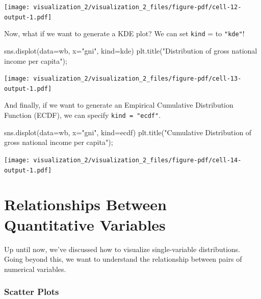 \documentclass[
  letterpaper,
  DIV=11,
  numbers=noendperiod]{scrreprt}
\newenvironment{Shaded}{\begin{snugshade}}{\end{snugshade}}
\newcommand{\NormalTok}[1]{\textcolor[rgb]{0.00,0.23,0.31}{#1}}
\newcommand{\OperatorTok}[1]{\textcolor[rgb]{0.37,0.37,0.37}{#1}}
\newcommand{\StringTok}[1]{\textcolor[rgb]{0.13,0.47,0.30}{#1}}
\begin{document}
\texttt{[image: visualization\_2/visualization\_2\_files/figure-pdf/cell-12-output-1.pdf]}

Now, what if we want to generate a KDE plot? We can set \texttt{kind} =
to \texttt{"kde"}!

\begin{Shaded}
\begin{Highlighting}[]
\NormalTok{sns.displot(data}\OperatorTok{=}\NormalTok{wb, }
\NormalTok{            x}\OperatorTok{=}\StringTok{"gni"}\NormalTok{, }
\NormalTok{            kind}\OperatorTok{=}\StringTok{\textquotesingle{}kde\textquotesingle{}}\NormalTok{)}
\NormalTok{plt.title(}\StringTok{"Distribution of gross national income per capita"}\NormalTok{)}\OperatorTok{;}
\end{Highlighting}
\end{Shaded}

\texttt{[image: visualization\_2/visualization\_2\_files/figure-pdf/cell-13-output-1.pdf]}

And finally, if we want to generate an Empirical Cumulative Distribution
Function (ECDF), we can specify \texttt{kind\ =\ "ecdf"}.

\begin{Shaded}
\begin{Highlighting}[]
\NormalTok{sns.displot(data}\OperatorTok{=}\NormalTok{wb, }
\NormalTok{            x}\OperatorTok{=}\StringTok{"gni"}\NormalTok{, }
\NormalTok{            kind}\OperatorTok{=}\StringTok{\textquotesingle{}ecdf\textquotesingle{}}\NormalTok{)}
\NormalTok{plt.title(}\StringTok{"Cumulative Distribution of gross national income per capita"}\NormalTok{)}\OperatorTok{;}
\end{Highlighting}
\end{Shaded}

\texttt{[image: visualization\_2/visualization\_2\_files/figure-pdf/cell-14-output-1.pdf]}

\section{Relationships Between Quantitative
Variables}\label{relationships-between-quantitative-variables}

Up until now, we've discussed how to visualize single-variable
distributions. Going beyond this, we want to understand the relationship
between pairs of numerical variables.

\subsubsection{Scatter Plots}\label{scatter-plots}
\end{document}
